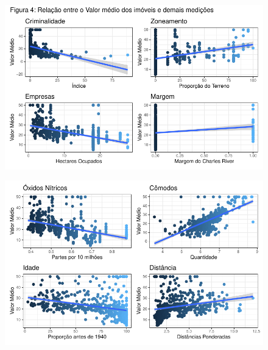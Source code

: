 \documentclass[
  letterpaper,
]{report}
\begin{document}
\begin{figure}[H]

{\centering \includegraphics{Parte-1_files/figure-pdf/unnamed-chunk-5-1.pdf}

}

\end{figure}

\begin{figure}[H]

{\centering \includegraphics{Parte-1_files/figure-pdf/unnamed-chunk-5-2.pdf}

}

\end{figure}
\end{document}
